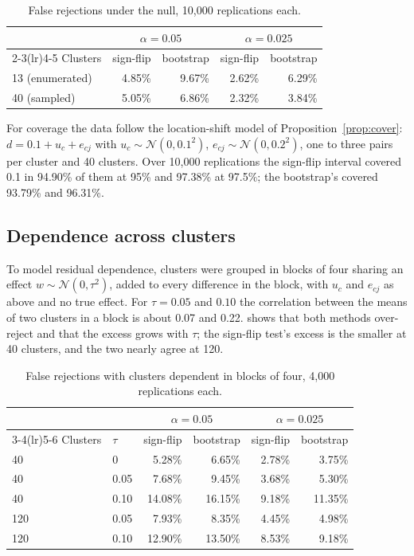 \documentclass[11pt]{article}
\theoremstyle{plain}
\theoremstyle{definition}
\theoremstyle{remark}
\begin{document}
\begin{table}[ht]
\centering\small
\caption{False rejections under the null, 10{,}000 replications each.}\label{tab:null}
\begin{tabular}{@{}lrrrr@{}}
\toprule
& \multicolumn{2}{c}{$\alpha = 0.05$} & \multicolumn{2}{c}{$\alpha = 0.025$} \\
\cmidrule(lr){2-3}\cmidrule(lr){4-5}
Clusters & sign-flip & bootstrap & sign-flip & bootstrap \\
\midrule
13 (enumerated) & 4.85\% & 9.67\% & 2.62\% & 6.29\% \\
40 (sampled) & 5.05\% & 6.86\% & 2.32\% & 3.84\% \\
\bottomrule
\end{tabular}
\end{table}

For coverage the data follow the location-shift model of Proposition~\ref{prop:cover}: $d = 0.1 + u_c +
e_{cj}$ with $u_c \sim \mathcal{N}(0, 0.1^2)$, $e_{cj} \sim \mathcal{N}(0, 0.2^2)$, one to three
pairs per cluster and 40 clusters. Over 10{,}000 replications the sign-flip interval covered 0.1 in
94.90\% of them at 95\% and 97.38\% at 97.5\%; the bootstrap's covered 93.79\% and 96.31\%.

\subsection{Dependence across clusters}
To model residual dependence, clusters were grouped in blocks of four sharing an effect $w \sim
\mathcal{N}(0, \tau^2)$, added to every difference in the block, with $u_c$ and $e_{cj}$ as above
and no true effect. For $\tau = 0.05$ and $0.10$ the correlation between the means of two clusters
in a block is about 0.07 and 0.22.  shows that both methods over-reject and that the
excess grows with $\tau$; the sign-flip test's excess is the smaller at 40 clusters, and the two
nearly agree at 120.

\begin{table}[ht]
\centering\small
\caption{False rejections with clusters dependent in blocks of four, 4{,}000 replications
each.}\label{tab:dep}
\begin{tabular}{@{}llrrrr@{}}
\toprule
& & \multicolumn{2}{c}{$\alpha = 0.05$} & \multicolumn{2}{c}{$\alpha = 0.025$} \\
\cmidrule(lr){3-4}\cmidrule(lr){5-6}
Clusters & $\tau$ & sign-flip & bootstrap & sign-flip & bootstrap \\
\midrule
40 & 0 & 5.28\% & 6.65\% & 2.78\% & 3.75\% \\
40 & 0.05 & 7.68\% & 9.45\% & 3.68\% & 5.30\% \\
40 & 0.10 & 14.08\% & 16.15\% & 9.18\% & 11.35\% \\
120 & 0.05 & 7.93\% & 8.35\% & 4.45\% & 4.98\% \\
120 & 0.10 & 12.90\% & 13.50\% & 8.53\% & 9.18\% \\
\bottomrule
\end{tabular}
\end{table}
\end{document}
